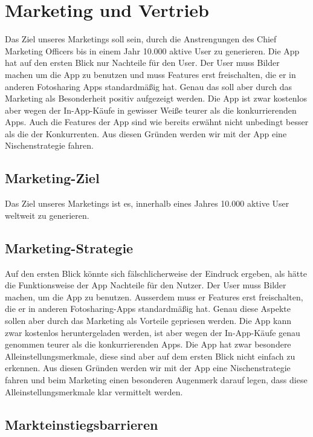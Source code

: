 \chapter{Marketing und Vertrieb}

Das Ziel unseres Marketings soll sein, durch die Anstrengungen des Chief Marketing Officers bis in einem Jahr 10.000 aktive User zu generieren.
Die App hat auf den ersten Blick nur Nachteile für den User. Der User muss Bilder machen um die App zu benutzen und muss Features erst freischalten, die er in anderen Fotosharing Apps standardmäßig hat. Genau das soll aber durch das Marketing als Besonderheit positiv aufgezeigt werden.
Die App ist zwar kostenlos aber wegen der In-App-Käufe in gewisser Weiße teurer als die konkurrierenden Apps. Auch die Features der App sind wie bereits erwähnt nicht unbedingt besser als die der Konkurrenten. Aus diesen Gründen werden wir mit der App eine Nischenstrategie fahren.

\section{Marketing-Ziel}

Das Ziel unseres Marketings ist es, innerhalb eines Jahres 10.000 aktive User weltweit zu generieren.

\section{Marketing-Strategie}

Auf den ersten Blick könnte sich fälschlicherweise der Eindruck ergeben, als hätte die Funktionsweise der App Nachteile für den Nutzer. Der User muss Bilder machen, um die App zu benutzen. Ausserdem muss er Features erst freischalten, die er in anderen Fotosharing-Apps standardmäßig hat. Genau diese Aspekte sollen aber durch das Marketing als Vorteile gepriesen werden.
Die App kann zwar kostenlos heruntergeladen werden, ist aber wegen der In-App-Käufe genau genommen teurer als die konkurrierenden Apps. Die App hat zwar besondere Alleinstellungsmerkmale, diese sind aber auf dem ersten Blick nicht einfach zu erkennen. Aus diesen Gründen werden wir mit der App eine Nischenstrategie fahren und beim Marketing einen besonderen Augenmerk darauf legen, dass diese Alleinstellungsmerkmale klar vermittelt werden.

\section{Markteinstiegsbarrieren}

